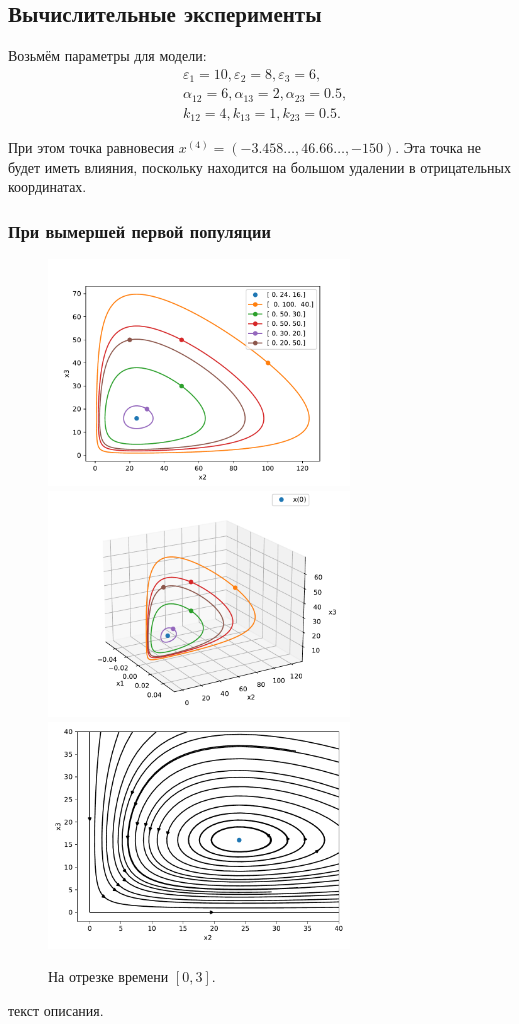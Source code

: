 \subsection{Вычислительные эксперименты}
    Возьмём параметры для модели:
    \[
        \begin{split}
            & \varepsilon_1 = 10, \varepsilon_2 = 8, \varepsilon_3 = 6, \\
            & \alpha_{12} = 6, \alpha_{13} = 2, \alpha_{23} = 0.5, \\
            & k_{12} = 4, k_{13} = 1, k_{23} = 0.5.
        \end{split}
    \]

    При этом точка равновесия \( x^{(4)} = ( -3.458\dots, 46.66\dots, -150 ) \). Эта точка не будет иметь влияния, поскольку находится на большом удалении в отрицательных координатах.

    \subsubsection{При вымершей первой популяции}

    \begin{figure}[H]
        \centering
        \includegraphics[width=8cm]{pictures/x1_0phase.pdf}
        \includegraphics[width=8cm]{pictures/x1_0phase3.pdf}
        \includegraphics[width=8cm]{pictures/x1_0vector.pdf}
        \caption{На отрезке времени \( [0, 3] \).}
    \end{figure}
    текст описания.


